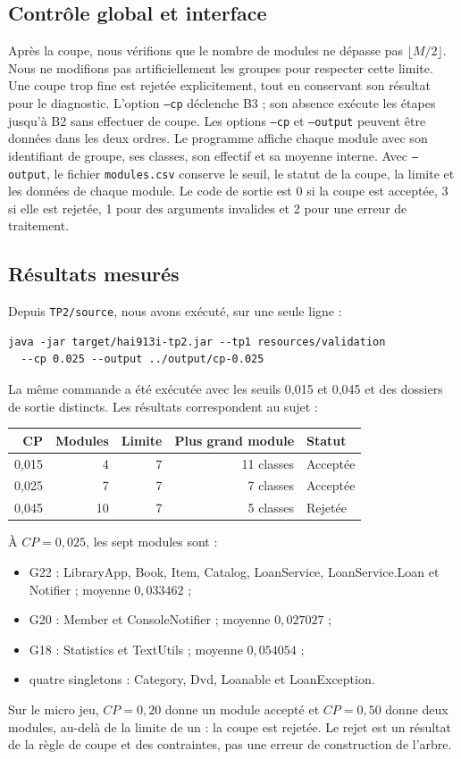\documentclass[11pt,a4paper]{article}
\begin{document}
\subsection{Contrôle global et interface}
Après la coupe, nous vérifions que le nombre de modules ne dépasse pas
$\lfloor M/2\rfloor$. Nous ne modifions pas artificiellement les groupes
pour respecter cette limite. Une coupe trop fine est rejetée explicitement,
tout en conservant son résultat pour le diagnostic.
L'option \texttt{--cp} déclenche B3 ; son absence exécute les étapes jusqu'à B2
sans effectuer de coupe. Les options \texttt{--cp} et \texttt{--output} peuvent
être données dans les deux ordres. Le programme affiche chaque module avec
son identifiant de groupe, ses classes, son effectif et sa moyenne interne.
Avec \texttt{--output}, le fichier \texttt{modules.csv} conserve le seuil,
le statut de la coupe, la limite et les données de chaque module.
Le code de sortie est 0 si la coupe est acceptée, 3 si elle est rejetée,
1 pour des arguments invalides et 2 pour une erreur de traitement.

\subsection{Résultats mesurés}
Depuis \texttt{TP2/source}, nous avons exécuté, sur une seule ligne :
\begin{verbatim}
java -jar target/hai913i-tp2.jar --tp1 resources/validation
  --cp 0.025 --output ../output/cp-0.025
\end{verbatim}
La même commande a été exécutée avec les seuils 0,015 et 0,045 et des dossiers
de sortie distincts. Les résultats correspondent au sujet :
\begin{center}
\begin{tabular}{rrrrl}
CP & Modules & Limite & Plus grand module & Statut \\
\hline
0,015 & 4 & 7 & 11 classes & Acceptée \\
0,025 & 7 & 7 & 7 classes & Acceptée \\
0,045 & 10 & 7 & 5 classes & Rejetée
\end{tabular}
\end{center}
À $CP=0{,}025$, les sept modules sont :
\begin{itemize}
\item G22 : LibraryApp, Book, Item, Catalog, LoanService, LoanService.Loan et
Notifier ; moyenne $0{,}033462$ ;
\item G20 : Member et ConsoleNotifier ; moyenne $0{,}027027$ ;
\item G18 : Statistics et TextUtils ; moyenne $0{,}054054$ ;
\item quatre singletons : Category, Dvd, Loanable et LoanException.
\end{itemize}
Sur le micro jeu, $CP=0{,}20$ donne un module accepté et $CP=0{,}50$ donne deux
modules, au-delà de la limite de un : la coupe est rejetée.
Le rejet est un résultat de la règle de coupe et des contraintes, pas une
erreur de construction de l'arbre.
\end{document}
